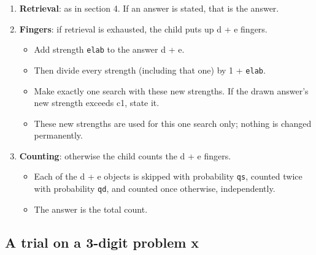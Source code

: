 \begin{enumerate}
\def\labelenumi{\arabic{enumi}.}
\tightlist
\item
  \textbf{Retrieval}: as in section 4. If an answer is stated, that is the answer.
\item
  \textbf{Fingers}: if retrieval is exhausted, the child puts up d + e fingers.

  \begin{itemize}
  \tightlist
  \item
    Add strength \texttt{elab} to the answer d + e.
  \item
    Then divide every strength (including that one) by 1 + \texttt{elab}.
  \item
    Make exactly one search with these new strengths. If the drawn answer's new strength exceeds c1, state it.
  \item
    These new strengths are used for this one search only; nothing is changed permanently.
  \end{itemize}
\item
  \textbf{Counting}: otherwise the child counts the d + e fingers.

  \begin{itemize}
  \tightlist
  \item
    Each of the d + e objects is skipped with probability \texttt{qs}, counted twice with probability \texttt{qd}, and counted once otherwise, independently.
  \item
    The answer is the total count.
  \end{itemize}
\end{enumerate}

\subsection{A trial on a 3-digit problem x}\label{a-trial-on-a-3-digit-problem-x}

